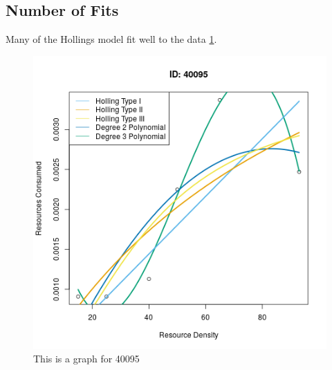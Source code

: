 \documentclass{article}
\begin{document}
\subsection{Number of Fits}
Many of the Hollings model fit well to the data \ref{fig:2}. %
\begin{figure}[h] %
    \centering
    \includegraphics[width=5in]{../Results/Plots/40095}
    \caption{This is a graph for 40095}
    \label{fig:2}
\end{figure}
\end{document}
